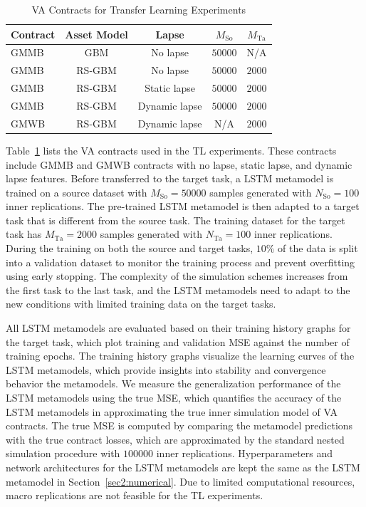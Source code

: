 \begin{table}[ht!] 
    \centering
    \begin{tabular}{lcccc} 
    \toprule
    \textbf{Contract} & \textbf{Asset Model} & \textbf{Lapse} & \textbf{$M_{\text{So}}$}  & \textbf{$M_{\text{Ta}}$}\\
    \midrule
    GMMB & GBM & No lapse & $\num{50000}$ & N/A \\
    GMMB & RS-GBM & No lapse & $\num{50000}$ & $\num{2000}$ \\
    GMMB & RS-GBM & Static lapse & $\num{50000}$ & $\num{2000}$ \\
    GMMB & RS-GBM & Dynamic lapse & $\num{50000}$ & $\num{2000}$ \\
    GMWB & RS-GBM & Dynamic lapse & N/A & $\num{2000}$ \\
    \bottomrule
    \end{tabular}
    \caption{VA Contracts for Transfer Learning Experiments}
    \label{tab3:contracts}
\end{table}

Table~\ref{tab3:contracts} lists the VA contracts used in the TL experiments.
These contracts include GMMB and GMWB contracts with no lapse, static lapse, and dynamic lapse features.
Before transferred to the target task, a LSTM metamodel is trained on a source dataset with $M_{\text{So}} = \num{50000}$ samples generated with $N_{\text{So}} = \num{100}$ inner replications\footnotemark.
The pre-trained LSTM metamodel is then adapted to a target task that is different from the source task.
The training dataset for the target task has $M_{\text{Ta}} = \num{2000}$ samples generated with $N_{\text{Ta}} = \num{100}$ inner replications.
During the training on both the source and target tasks, $10\%$ of the data is split into a validation dataset to monitor the training process and prevent overfitting using early stopping.
The complexity of the simulation schemes increases from the first task to the last task, and the LSTM metamodels need to adapt to the new conditions with limited training data on the target tasks.

All LSTM metamodels are evaluated based on their training history graphs for the target task, which plot training and validation MSE against the number of training epochs.
The training history graphs visualize the learning curves of the LSTM metamodels, which provide insights into stability and convergence behavior the metamodels.
We measure the generalization performance of the LSTM metamodels using the true MSE, which quantifies the accuracy of the LSTM metamodels in approximating the true inner simulation model of VA contracts.
The true MSE is computed by comparing the metamodel predictions with the true contract losses, which are approximated by the standard nested simulation procedure with $\num{100000}$ inner replications.
Hyperparameters and network architectures for the LSTM metamodels are kept the same as the LSTM metamodel in Section~\ref{sec2:numerical}. 
Due to limited computational resources, macro replications are not feasible for the TL experiments.

